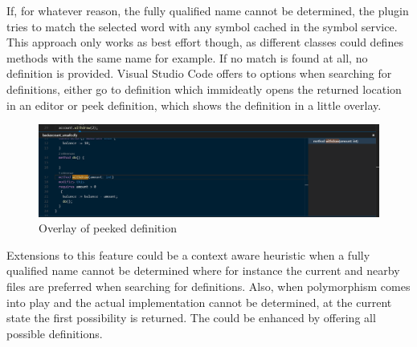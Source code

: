 If, for whatever reason, the fully qualified name cannot be determined, the plugin tries to match the selected word with any symbol cached in the symbol service. This approach only works as best effort though, as different classes could defines methods with the same name for example. If no match is found at all, no definition is provided. \newline
Visual Studio Code offers to options when searching for definitions, either go to definition which immideatly opens the returned location in an editor or peek definition, which shows the definition in a little overlay. \newline
 \begin{figure}[H]
	\centering
	\includegraphics[width=1\textwidth]{img/goToDefinitionPeek}
	\caption{Overlay of peeked definition}
	\label{fig:gotodefinitionpeek}
\end{figure}
Extensions to this feature could be a context aware heuristic when a fully qualified name cannot be determined where for instance the current and nearby files are preferred when searching for definitions. Also, when polymorphism comes into play and the actual implementation cannot be determined, at the current state the first possibility is returned. The could be enhanced by offering all possible definitions.


